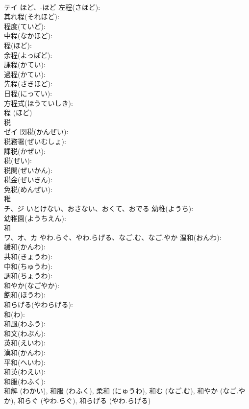 \documentclass[8pt]{extreport}
\begin{document}
\begin{CJK}{UTF8}{min}
\\	テイ	ほど、-ほど	左程(さほど): 
\\	其れ程(それほど): 
\\	程度(ていど): 
\\	中程(なかほど): 
\\	程(ほど): 
\\	余程(よっぽど): 
\\	課程(かてい): 
\\	過程(かてい): 
\\	先程(さきほど): 
\\	日程(にってい): 
\\	方程式(ほうていしき): 
\\	程 (ほど)
\\	税			
\\	ゼイ		関税(かんぜい): 
\\	税務署(ぜいむしょ): 
\\	課税(かぜい): 
\\	税(ぜい): 
\\	税関(ぜいかん): 
\\	税金(ぜいきん): 
\\	免税(めんぜい): 
\\	稚			
\\	チ、ジ	いとけない、おさない、おくて、おでる	幼稚(ようち): 
\\	幼稚園(ようちえん): 
\\	和			
\\	ワ、オ、カ	やわ.らぐ、やわ.らげる、なご.む、なご.やか	温和(おんわ): 
\\	緩和(かんわ): 
\\	共和(きょうわ): 
\\	中和(ちゅうわ): 
\\	調和(ちょうわ): 
\\	和やか(なごやか): 
\\	飽和(ほうわ): 
\\	和らげる(やわらげる): 
\\	和(わ): 
\\	和風(わふう): 
\\	和文(わぶん): 
\\	英和(えいわ): 
\\	漢和(かんわ): 
\\	平和(へいわ): 
\\	和英(わえい): 
\\	和服(わふく): 
\\	和解 (わかい), 和服 (わふく), 柔和 (にゅうわ), 和む (なご.む), 和やか (なご.やか), 和らぐ (やわ.らぐ), 和らげる (やわ.らげる)

\end{CJK}
\end{document}
